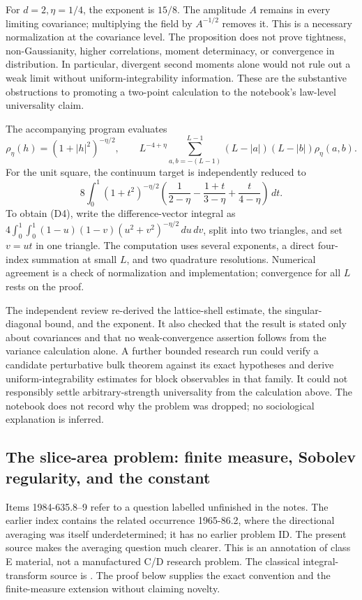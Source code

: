 For \(d=2,\eta=1/4\), the exponent is \(15/8\). The amplitude \(A\) remains in every limiting covariance; multiplying the field by \(A^{-1/2}\) removes it. This is a necessary normalization at the covariance level. The proposition does not prove tightness, non-Gaussianity, higher correlations, moment determinacy, or convergence in distribution. In particular, divergent second moments alone would not rule out a weak limit without uniform-integrability information. These are the substantive obstructions to promoting a two-point calculation to the notebook's law-level universality claim.

\begin{remark}\oursComputed
The accompanying program evaluates
\[
 \rho_\eta(h)=(1+|h|^2)^{-\eta/2},
 \qquad
 L^{-4+\eta}\sum_{a,b=-(L-1)}^{L-1}
 (L-|a|)(L-|b|)\rho_\eta(a,b).
 \tag{D3}
\]
For the unit square, the continuum target is independently reduced to
\[
 8\int_0^1 (1+t^2)^{-\eta/2}
 \left(\frac1{2-\eta}-\frac{1+t}{3-\eta}
             +\frac{t}{4-\eta}\right)\,dt.
 \tag{D4}
\]
To obtain (D4), write the difference-vector integral as
\(4\int_0^1\int_0^1(1-u)(1-v)(u^2+v^2)^{-\eta/2}\,du\,dv\),
split into two triangles, and set \(v=ut\) in one triangle.
The computation uses several exponents, a direct four-index summation at small \(L\), and two quadrature resolutions. Numerical agreement is a check of normalization and implementation; convergence for all \(L\) rests on the proof.
\end{remark}

The independent review re-derived the lattice-shell estimate, the singular-diagonal bound, and the exponent. It also checked that the result is stated only about covariances and that no weak-convergence assertion follows from the variance calculation alone. A further bounded research run could verify a candidate perturbative bulk theorem against its exact hypotheses and derive uniform-integrability estimates for block observables in that family. It could not responsibly settle arbitrary-strength universality from the calculation above. The notebook does not record why the problem was dropped; no sociological explanation is inferred.

\subsection{The slice-area problem: finite measure, Sobolev regularity, and the constant}
\label{dev:slices}

Items 1984-635.8--9 refer to a question labelled unfinished in the notes. The earlier index contains the related occurrence 1965-86.2, where the directional averaging was itself underdetermined; it has no earlier problem ID. The present source makes the averaging question much clearer. This is an annotation of class E material, not a manufactured C/D research problem. The classical integral-transform source is \citet[Chapter I, Section 1.5]{gelfandgraevvilenkin1966integral}. The proof below supplies the exact convention and the finite-measure extension without claiming novelty.

